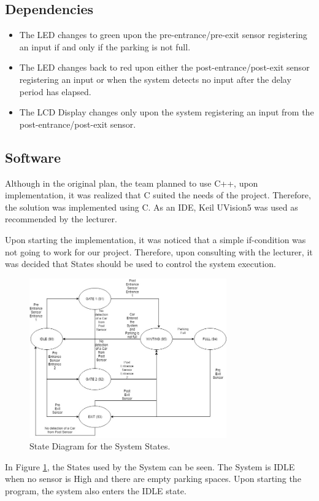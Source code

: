 \documentclass[11pt,a4paper,twocolumn]{article}
\begin{document}
\subsection{Dependencies}
\begin{itemize}
\item  The LED changes to green upon the pre-entrance/pre-exit sensor registering an input if and only if the parking is not full. 
\item The LED changes back to red upon either the post-entrance/post-exit sensor registering an input or when the system detects no input after the delay period has elapsed.
\item The  LCD Display changes only upon the system registering an input from the post-entrance/post-exit sensor. 
\end{itemize}

\subsection{Software}
Although in the original plan, the team planned to use C++, upon implementation, it was realized that C suited the needs of the project. Therefore, the solution was implemented using C. As an IDE, Keil UVision5 was used as recommended by the lecturer. 

Upon starting the implementation, it was noticed that a simple if-condition was not going to work for our project. Therefore, upon consulting with the lecturer, it was decided that States should be used to control the system execution. 
\begin{figure}
	\centering
	\includegraphics[width=85mm]{states}
	\caption{State Diagram for the System States.}
	\label{fig:states}
	\centering
\end{figure}
In Figure \ref{fig:states}, the States used by the System can be seen. The System is IDLE when no sensor is High and there are empty parking spaces. Upon starting the program, the system also enters the IDLE state. 
\end{document}
